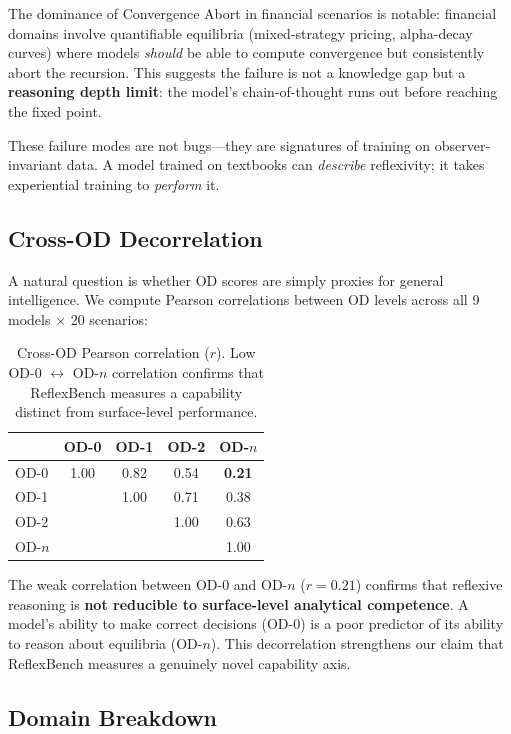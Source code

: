\documentclass{article}
\begin{document}
The dominance of Convergence Abort in financial scenarios is notable: financial domains involve quantifiable equilibria (mixed-strategy pricing, alpha-decay curves) where models \textit{should} be able to compute convergence but consistently abort the recursion. This suggests the failure is not a knowledge gap but a \textbf{reasoning depth limit}: the model's chain-of-thought runs out before reaching the fixed point.

These failure modes are not bugs---they are signatures of training on observer-invariant data. A model trained on textbooks can \textit{describe} reflexivity; it takes experiential training to \textit{perform} it.

\subsection{Cross-OD Decorrelation}

A natural question is whether OD scores are simply proxies for general intelligence. We compute Pearson correlations between OD levels across all 9 models $\times$ 20 scenarios:

\begin{table}[h]
\centering
\caption{Cross-OD Pearson correlation ($r$). Low OD-0 $\leftrightarrow$ OD-$n$ correlation confirms that ReflexBench measures a capability distinct from surface-level performance.}
\label{tab:decorrelation}
\begin{tabular}{@{}lcccc@{}}
\toprule
& OD-0 & OD-1 & OD-2 & OD-$n$ \\
\midrule
OD-0 & 1.00 & 0.82 & 0.54 & \textbf{0.21} \\
OD-1 & & 1.00 & 0.71 & 0.38 \\
OD-2 & & & 1.00 & 0.63 \\
OD-$n$ & & & & 1.00 \\
\bottomrule
\end{tabular}
\end{table}

The weak correlation between OD-0 and OD-$n$ ($r = 0.21$) confirms that reflexive reasoning is \textbf{not reducible to surface-level analytical competence}. A model's ability to make correct decisions (OD-0) is a poor predictor of its ability to reason about equilibria (OD-$n$). This decorrelation strengthens our claim that ReflexBench measures a genuinely novel capability axis.

\subsection{Domain Breakdown}
\end{document}
